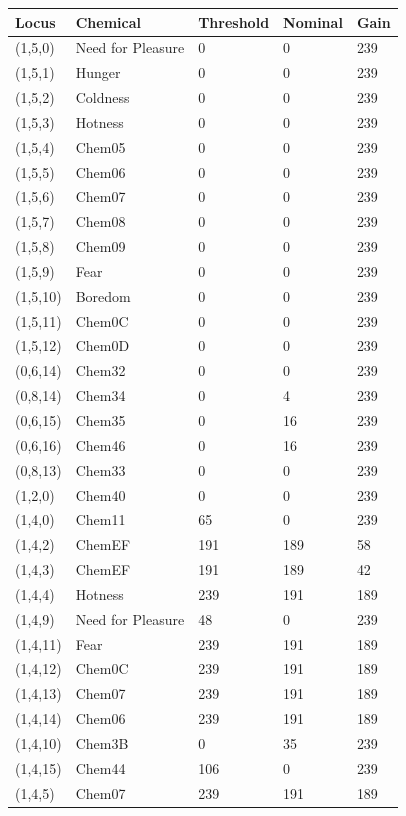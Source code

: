 \documentclass{article}
\begin{document}
\begin{longtable}{|p{2cm}|p{2cm}|p{2cm}|p{2cm}|p{2cm}|}
\hline
{\bf Locus} & {\bf Chemical} & {\bf Threshold} & {\bf Nominal} & {\bf Gain} \\ \hline
(1,5,0) & Need for Pleasure & 0 & 0 & 239 \\ \hline
(1,5,1) & Hunger & 0 & 0 & 239 \\ \hline
(1,5,2) & Coldness & 0 & 0 & 239 \\ \hline
(1,5,3) & Hotness & 0 & 0 & 239 \\ \hline
(1,5,4) & Chem05 & 0 & 0 & 239 \\ \hline
(1,5,5) & Chem06 & 0 & 0 & 239 \\ \hline
(1,5,6) & Chem07 & 0 & 0 & 239 \\ \hline
(1,5,7) & Chem08 & 0 & 0 & 239 \\ \hline
(1,5,8) & Chem09 & 0 & 0 & 239 \\ \hline
(1,5,9) & Fear & 0 & 0 & 239 \\ \hline
(1,5,10) & Boredom & 0 & 0 & 239 \\ \hline
(1,5,11) & Chem0C & 0 & 0 & 239 \\ \hline
(1,5,12) & Chem0D & 0 & 0 & 239 \\ \hline
(0,6,14) & Chem32 & 0 & 0 & 239 \\ \hline
(0,8,14) & Chem34 & 0 & 4 & 239 \\ \hline
(0,6,15) & Chem35 & 0 & 16 & 239 \\ \hline
(0,6,16) & Chem46 & 0 & 16 & 239 \\ \hline
(0,8,13) & Chem33 & 0 & 0 & 239 \\ \hline
(1,2,0) & Chem40 & 0 & 0 & 239 \\ \hline
(1,4,0) & Chem11 & 65 & 0 & 239 \\ \hline
(1,4,2) & ChemEF & 191 & 189 & 58 \\ \hline
(1,4,3) & ChemEF & 191 & 189 & 42 \\ \hline
(1,4,4) & Hotness & 239 & 191 & 189 \\ \hline
(1,4,9) & Need for Pleasure & 48 & 0 & 239 \\ \hline
(1,4,11) & Fear & 239 & 191 & 189 \\ \hline
(1,4,12) & Chem0C & 239 & 191 & 189 \\ \hline
(1,4,13) & Chem07 & 239 & 191 & 189 \\ \hline
(1,4,14) & Chem06 & 239 & 191 & 189 \\ \hline
(1,4,10) & Chem3B & 0 & 35 & 239 \\ \hline
(1,4,15) & Chem44 & 106 & 0 & 239 \\ \hline
(1,4,5) & Chem07 & 239 & 191 & 189 \\ \hline
\end{longtable}
\end{document}
